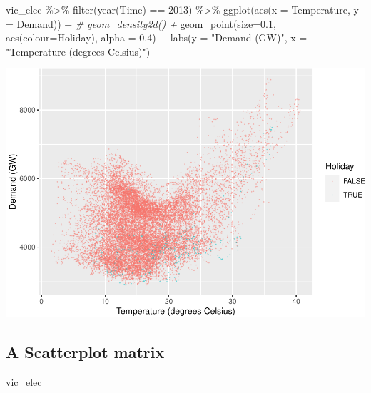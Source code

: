 \documentclass[
]{book}
\newenvironment{Shaded}{\begin{snugshade}}{\end{snugshade}}
\newcommand{\AttributeTok}[1]{\textcolor[rgb]{0.77,0.63,0.00}{#1}}
\newcommand{\CommentTok}[1]{\textcolor[rgb]{0.56,0.35,0.01}{\textit{#1}}}
\newcommand{\DecValTok}[1]{\textcolor[rgb]{0.00,0.00,0.81}{#1}}
\newcommand{\FloatTok}[1]{\textcolor[rgb]{0.00,0.00,0.81}{#1}}
\newcommand{\FunctionTok}[1]{\textcolor[rgb]{0.00,0.00,0.00}{#1}}
\newcommand{\NormalTok}[1]{#1}
\newcommand{\SpecialCharTok}[1]{\textcolor[rgb]{0.00,0.00,0.00}{#1}}
\newcommand{\StringTok}[1]{\textcolor[rgb]{0.31,0.60,0.02}{#1}}
\begin{document}
\begin{Shaded}
\begin{Highlighting}[]
\NormalTok{vic\_elec }\SpecialCharTok{\%\textgreater{}\%}
  \FunctionTok{filter}\NormalTok{(}\FunctionTok{year}\NormalTok{(Time) }\SpecialCharTok{==} \DecValTok{2013}\NormalTok{) }\SpecialCharTok{\%\textgreater{}\%}
  \FunctionTok{ggplot}\NormalTok{(}\FunctionTok{aes}\NormalTok{(}\AttributeTok{x =}\NormalTok{ Temperature, }\AttributeTok{y =}\NormalTok{ Demand)) }\SpecialCharTok{+}
\CommentTok{\#  geom\_density2d() +}
  \FunctionTok{geom\_point}\NormalTok{(}\AttributeTok{size=}\FloatTok{0.1}\NormalTok{, }\FunctionTok{aes}\NormalTok{(}\AttributeTok{colour=}\NormalTok{Holiday), }\AttributeTok{alpha =} \FloatTok{0.4}\NormalTok{) }\SpecialCharTok{+}
  \FunctionTok{labs}\NormalTok{(}\AttributeTok{y =} \StringTok{"Demand (GW)"}\NormalTok{, }\AttributeTok{x =} \StringTok{"Temperature (degrees Celsius)"}\NormalTok{)}
\end{Highlighting}
\end{Shaded}

\includegraphics{graphics/unnamed-chunk-20-1.pdf}

\hypertarget{a-scatterplot-matrix}{%
\subsection{A Scatterplot matrix}\label{a-scatterplot-matrix}}

\begin{Shaded}
\begin{Highlighting}[]
\NormalTok{vic\_elec}
\end{Highlighting}
\end{Shaded}
\end{document}
